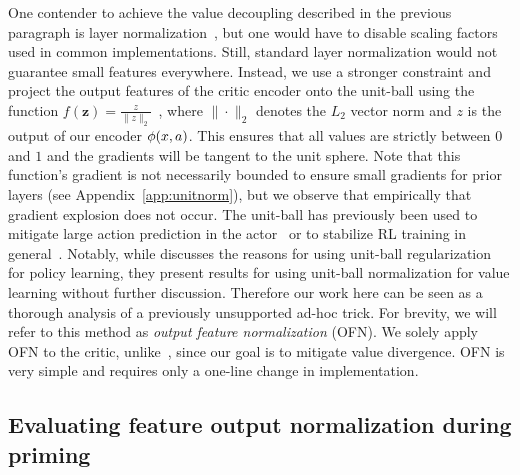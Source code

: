 One contender to achieve the value decoupling described in the previous paragraph is layer normalization~\parencite{ba2016layer}, but one would have to disable scaling factors used in common implementations. Still, standard layer normalization would not guarantee small features everywhere. Instead, we use a stronger constraint and project the output features of the critic encoder onto the unit-ball using the function
$f(\mathbf{z}) = \frac{z}{\|z\|_2}$~\parencite{zhang2019root}, 
where $\|\cdot\|_2$ denotes the $L_2$ vector norm and $z$ is the output of our encoder $\phi(x, a)$. This ensures that all values are strictly between $0$ and $1$ and the gradients will be tangent to the unit sphere. Note that this function's gradient is not necessarily bounded to ensure small gradients for prior layers (see Appendix~\ref{app:unitnorm}), but we observe that empirically that gradient explosion does not occur. 
The unit-ball has previously been used to mitigate large action prediction in the actor~\parencite{wang2020striving} or to stabilize RL training in general~\parencite{bjorck2022is}.
Notably, while \textcite{bjorck2022is} discusses the reasons for using unit-ball regularization for policy learning, they present results for using unit-ball normalization for value learning without further discussion.
Therefore our work here can be seen as a thorough analysis of a previously unsupported ad-hoc trick. 
For brevity, we will refer to this method as {\em output feature normalization} (OFN). We solely apply OFN to the critic, unlike~\textcite{wang2020striving}, since our goal is to mitigate value divergence. OFN is very simple and requires only a one-line change in implementation.

\subsection{Evaluating feature output normalization during priming} \label{sec:evalmethod}

